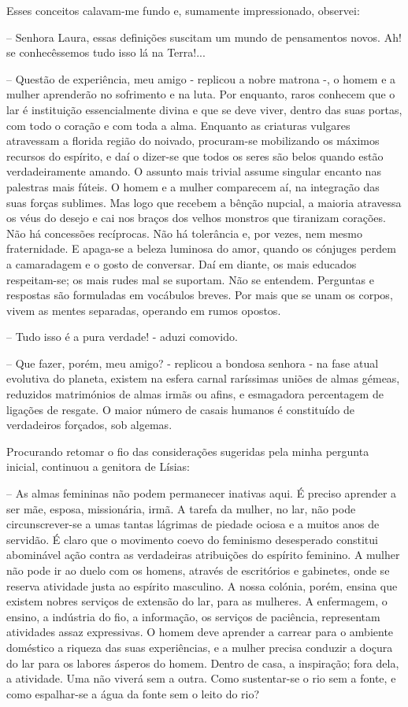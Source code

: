 \documentclass[portuguese,12pt,a4paper]{scrbook}
\begin{document}
	Esses conceitos calavam-me fundo e, sumamente impressionado, observei:
	
	
	– Senhora Laura, essas definições suscitam um mundo de pensamentos novos. Ah! se conhecêssemos tudo isso lá na Terra!...
	
	– Questão de experiência, meu amigo - replicou a nobre matrona -, o homem e a mulher aprenderão no sofrimento e na luta. Por enquanto, raros conhecem que o lar é instituição essencialmente divina e que se deve viver, dentro das suas portas, com todo o coração e com toda a alma. Enquanto as criaturas vulgares atravessam a florida região do noivado, procuram-se mobilizando os máximos recursos do espírito, e daí o dizer-se que todos os seres são belos quando estão verdadeiramente amando. O assunto mais trivial assume singular encanto nas palestras mais fúteis. O homem e a mulher comparecem aí, na integração das suas forças sublimes. Mas logo que recebem a bênção nupcial, a maioria atravessa os véus do desejo e cai nos braços dos velhos monstros que tiranizam corações. Não há concessões recíprocas. Não há tolerância e, por vezes, nem mesmo fraternidade. E apaga-se a beleza luminosa do amor, quando os cónjuges perdem a camaradagem e o gosto de conversar. Daí em diante, os mais educados respeitam-se; os mais rudes mal se suportam. Não se entendem. Perguntas e respostas são formuladas em vocábulos breves. Por mais que se unam os corpos, vivem as mentes separadas, operando em rumos opostos.
	
	– Tudo isso é a pura verdade! - aduzi comovido.
	
	– Que fazer, porém, meu amigo? - replicou a bondosa senhora - na fase atual evolutiva do planeta, existem na esfera carnal raríssimas uniões de almas gémeas, reduzidos matrimónios de almas irmãs ou afins, e esmagadora percentagem de ligações de resgate. O maior número de casais humanos é constituído de verdadeiros forçados, sob algemas.
	
	Procurando retomar o fio das considerações sugeridas pela minha pergunta inicial, continuou a genitora de Lísias:
	
	
	– As almas femininas não podem permanecer inativas aqui. É preciso aprender a ser mãe, esposa, missionária, irmã. A tarefa da mulher, no lar, não pode circunscrever-se a umas tantas lágrimas de piedade ociosa e a muitos anos de servidão. É claro que o movimento coevo do feminismo desesperado constitui abominável ação contra as verdadeiras atribuições do espírito feminino. A mulher não pode ir ao duelo com os homens, através de escritórios e gabinetes, onde se reserva atividade justa ao espírito masculino. A nossa colónia, porém, ensina que existem nobres serviços de extensão do lar, para as mulheres. A enfermagem, o ensino, a indústria do fio, a informação, os serviços de paciência, representam atividades assaz expressivas. O homem deve aprender a carrear para o ambiente doméstico a riqueza das suas experiências, e a mulher precisa conduzir a doçura do lar para os labores ásperos do homem. Dentro de casa, a inspiração; fora dela, a atividade. Uma não viverá sem a outra. Como sustentar-se o rio sem a fonte, e como espalhar-se a água da fonte sem o leito do rio?
	
\end{document}
